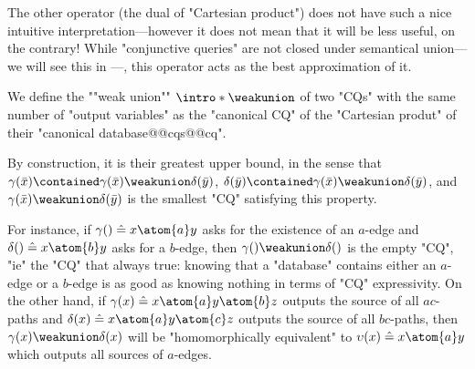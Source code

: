 The other operator (the dual of "Cartesian product")
does not have such a nice intuitive interpretation---however
it does not mean that it will be less useful, on the contrary!
While "conjunctive queries" are not closed under
semantical union---we will see this in ---, this operator
acts as the best approximation of it.

\begin{definition}
	We define the \AP""weak union"" \AP$\intro*\weakunion$ of two "CQs"
	with the same number of "output variables"
	as the "canonical CQ" of the "Cartesian produt" of their "canonical database@@cqs@@cq".
\end{definition}

By construction, it is their greatest upper bound,
in the sense that
$\gamma(\bar x) \contained \gamma(\bar x) \weakunion \delta(\bar y)$,
$\delta(\bar y) \contained \gamma(\bar x) \weakunion \delta(\bar y)$,
and $\gamma(\bar x) \weakunion \delta(\bar y)$ is the smallest "CQ" satisfying this property.

For instance, if $\gamma() \defeq x \atom{a} y$ asks for the existence of an $a$-edge
and $\delta() \defeq x \atom{b} y$ asks for a $b$-edge,
then $\gamma() \weakunion \delta()$ is the empty "CQ",
"ie" the "CQ" that always true: knowing that a "database" contains either an $a$-edge
or a $b$-edge is as good as knowing nothing in terms of "CQ" expressivity.
On the other hand, if $\gamma(x) \defeq x \atom{a} y \atom{b} z$ outputs the source of all 
$ac$-paths and $\delta(x) \defeq x \atom{a} y \atom{c} z$ outputs the source of all $bc$-paths,
then $\gamma(x) \weakunion \delta(x)$ will be "homomorphically equivalent" to
$\upsilon(x) \defeq x \atom{a} y$ which outputs all sources of $a$-edges.

